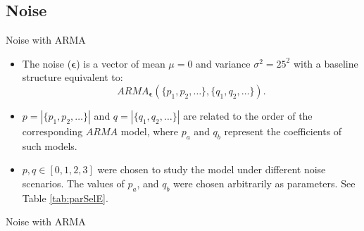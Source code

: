 \documentclass{beamer}
\begin{document}
\subsection{Noise}

\begin{frame}{Noise with ARMA}
\begin{itemize}
\item The noise ($\bm{\epsilon}$) is a vector of mean $\mu = 0$ and variance 
$\sigma^2=25^2$ with a baseline structure equivalent to: 
$$ARMA_{\bm{\epsilon}}\left( \{p_1,p_2,\dots\},\{q_1,q_2,\dots\} \right).$$

\item $p = \left| \{p_1,p_2,\dots\} \right|$ and $q= \left| \{q_1,q_2,\dots\} \right|$ are 
related to the order of the corresponding $ARMA$ model, where $p_a$ and $q_b$ represent the 
coefficients of such models.

\item $p,q \in [0,1,2,3]$ were chosen to study the model under 
different noise scenarios. The values of $p_a$, and $q_b$ were chosen arbitrarily 
as parameters. See Table \ref{tab:parSelE}.

\end{itemize}
\end{frame}

\begin{frame}{Noise with ARMA}
\begin{table}
\centering
\caption{Parameter Selection Related to $\bm{\epsilon}$}
\label{tab:parSelE}
\end{table}
\end{frame}
\end{document}
